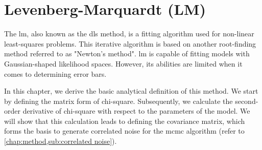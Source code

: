 \documentclass[12pt, TexShade, letterpaper]{report}
\begin{document}
\section{Levenberg-Marquardt (LM)}
\label{chap:method,sub:LM}
The \gls{lm}, also known as the \gls{dls} method, is a fitting algorithm used for non-linear least-squares problems. This iterative algorithm is based on another root-finding method referred to as "Newton's method". \gls{lm} is capable of fitting models with Gaussian-shaped likelihood spaces. However, its abilities are limited when it comes to determining error bars.\par
In this chapter, we derive the basic analytical definition of this method. We start by defining the matrix form of chi-square. Subsequently, we calculate the second-order derivative of chi-square with respect to the parameters of the model. We will show that this calculation leads to defining the covariance matrix, which forms the basis to generate correlated noise for the \gls{mcmc} algorithm (refer to \ref{chap:method,sub:correlated noise}).\par
\end{document}
